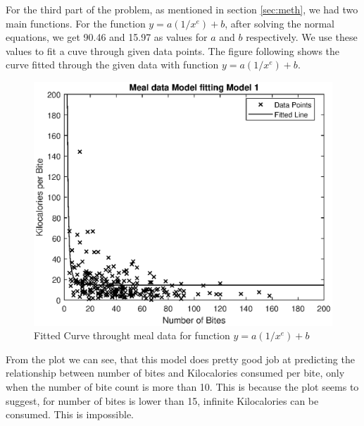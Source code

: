 \documentclass{article}
\begin{document}
For the third part of the problem, as mentioned in section \ref{sec:meth}, we had two main functions. For the function $y=a(1/x^{e})+ b$, after solving the normal equations, we get 90.46 and 15.97 as values for $a$ and $b$ respectively. We use these values to fit a cuve through given data points. The figure following shows the curve fitted through the given data with function $y=a(1/x^{e})+ b$.\\
\begin{figure}[!htb]
\centering
\includegraphics[scale=0.75]{thrd_result.eps}
\caption{Fitted Curve throught meal data for function $y=a(1/x^{e})+ b$ }
\label{fig:thrd_res}
\end{figure}
From the plot we can see, that this model does pretty good job at predicting the relationship between number of bites and Kilocalories consumed per bite, only when the number of bite count is more than 10. This is because the plot seems to suggest, for number of bites is lower than 15, infinite Kilocalories can be consumed. This is impossible.\\
\end{document}
